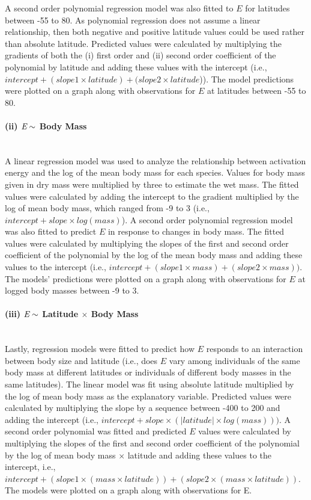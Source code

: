 \documentclass[11pt]{article}
\begin{document}
\begin{flushleft}
A second order polynomial regression model was also fitted to \emph{$E$} for latitudes between -55 to 80. As polynomial regression does not assume a linear relationship, then both negative and positive latitude values could be used rather than absolute latitude. Predicted values were calculated by multiplying the gradients of both the (i) first order and (ii) second order coefficient of the polynomial by latitude and adding these values with the intercept  (i.e., $intercept + (slope 1 \times latitude) + (slope 2 \times latitude$)). The model predictions were plotted on a graph along with observations for \emph{$E$} at latitudes between -55 to 80.  
\linebreak

\paragraph{(ii) $\emph{E} \sim$ Body Mass} \mbox{}\\
A linear regression model was used to analyze the relationship between activation energy and the log of the mean body mass for each species. Values for body mass given in dry mass were multiplied by three to estimate the wet mass. The fitted values were calculated by adding the intercept to the gradient multiplied by the log of mean body mass, which ranged from -9 to 3 (i.e., $intercept + slope \times log(mass)$). 
A second order polynomial regression model was also fitted to predict \emph{$E$} in response to changes in body mass. The fitted values were calculated by multiplying the slopes of the first and second order coefficient of the polynomial by the log of the mean body mass and adding these values to the intercept (i.e., $intercept + (slope1 \times mass) + (slope2 \times mass))$. The models’ predictions were plotted on a graph along with observations for \emph{$E$} at logged body masses between -9 to 3. 
\linebreak

\paragraph{(iii) $\emph{E} \sim$ Latitude $\times$ Body Mass}\mbox{}\\
Lastly, regression models were fitted to predict how \emph{$E$} responds to an interaction between body size and latitude (i.e., does \emph{$E$} vary among individuals of the same body mass at different latitudes or individuals of different body masses in the same latitudes). The linear model was fit using absolute latitude multiplied by the log of mean body mass as the explanatory variable. Predicted values were calculated by multiplying the slope by a sequence between -400 to 200 and adding the intercept (i.e., $intercept + slope \times (|latitude| \times log(mass)))$.
A second order polynomial was fitted and predicted $E$ values were calculated by multiplying the slopes of the first and second order coefficient of the polynomial by the log of mean body mass $\times$ latitude and adding these values to the intercept, i.e., $intercept + (slope 1 \times (mass \times latitude)) + (slope 2 \times (mass \times latitude))$. The models were plotted on a graph along with observations for E. 
\newpage


\end{flushleft}
\end{document}
